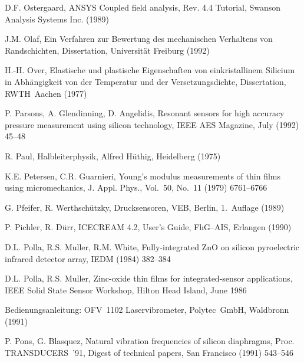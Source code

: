 \begin{thebibliography}{xxx}
 D.F. Ostergaard, {\sf ANSYS} Coupled field analysis, Rev. 4.4 Tutorial,
 Swanson Analysis Systems Inc. (1989)

 J.M. Olaf, Ein Verfahren zur Bewertung des mechanischen Verhaltens von
 Randschichten, Dissertation, Universität Freiburg (1992)

 H.-H. Over, Elastische und plastische Eigenschaften von einkristallinem
 Silicium in Abhängigkeit von der Temperatur und der Versetzungsdichte,
 Dissertation, RWTH~Aachen (1977)

 P. Parsons, A. Glendinning, D. Angelidis, Resonant sensors for high accuracy
 pressure measurement using silicon technology, IEEE AES Magazine,
 July (1992) 45--48

 R. Paul, Halbleiterphysik, Alfred Hüthig, Heidelberg (1975)


 K.E. Petersen, C.R. Guarnieri, Young's modulus measurements of thin films
 using micromechanics, J. Appl. Phys., Vol.~50, No.~11 (1979) 6761--6766


 G. Pfeifer, R. Werthschützky, Drucksensoren, VEB, Berlin,
 1.~Auflage (1989)

 P. Pichler, R. Dürr, {\sf ICECREAM} 4.2, User's Guide, FhG--AIS,
 Erlangen (1990)

 D.L. Polla, R.S. Muller, R.M. White, Fully-integrated ZnO on silicon
 pyroelectric infrared detector array, IEDM (1984) 382--384

 D.L. Polla, R.S. Muller, Zinc-oxide thin films for integrated-sensor
 applications, IEEE Solid State Sensor Workshop, Hilton Head Island,
 June 1986

 Bedienungsanleitung: OFV~1102 Laservibrometer, Polytec~GmbH,
 Waldbronn (1991)

 P. Pons, G. Blasquez, Natural vibration frequencies of silicon diaphragms,
 Proc. TRANSDUCERS~'91, Digest of technical papers, San Francisco
 (1991) 543--546


\end{thebibliography}
